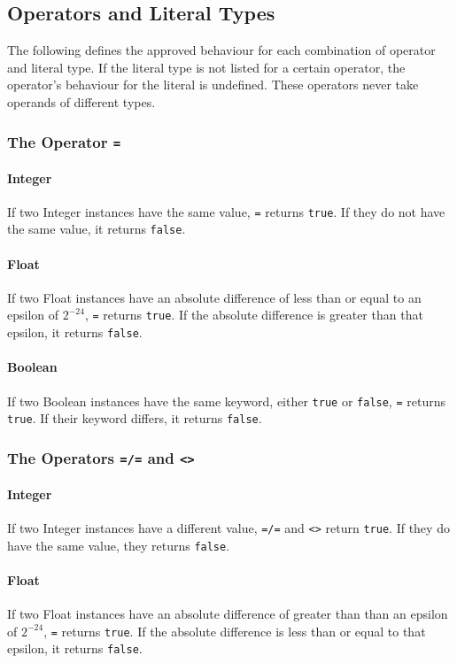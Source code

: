 \subsection{Operators and Literal Types}
The following defines the approved behaviour for each combination of operator and literal type. If the literal type is not listed for a certain operator, the operator's behaviour for the literal is undefined. These operators never take operands of different types.
\subsubsection{The Operator {\tt =}}
\paragraph{Integer}
If two Integer instances have the same value, \verb!=! returns \verb!true!. If they do not have the same value, it returns \verb!false!.
\paragraph{Float}
If two Float instances have an absolute difference of less than or equal to an epsilon of $2^{-24}$, \verb!=! returns \verb!true!. If the absolute difference is greater than that epsilon, it returns \verb!false!.
\paragraph{Boolean}
If two Boolean instances have the same keyword, either \verb!true! or \verb!false!, \verb!=! returns \verb!true!. If their keyword differs, it returns \verb!false!.

\subsubsection{The Operators {\tt =/=} and {\tt <>}}
\paragraph{Integer}
If two Integer instances have a different value, \verb!=/=! and \verb!<>! return \verb!true!. If they do have the same value, they returns \verb!false!.
\paragraph{Float}
If two Float instances have an absolute difference of greater than than an epsilon of $2^{-24}$, \verb!=! returns \verb!true!. If the absolute difference is less than or equal to that epsilon, it returns \verb!false!.
